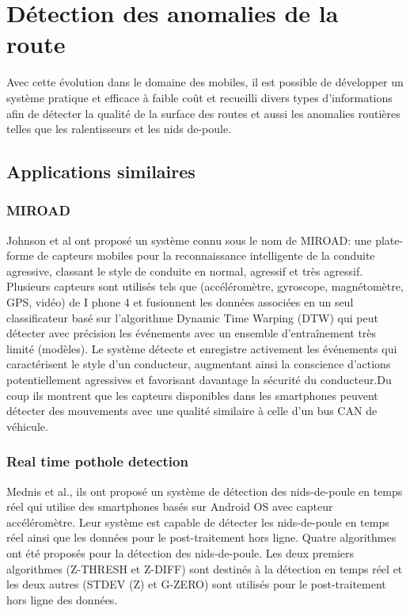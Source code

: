 \renewcommand\labelitemi{-}
\renewcommand\labelitemii{$\circ$}
\renewcommand {\thesection}{\arabic{section}}
\chapter{Détection des anomalies de la route}

Avec cette évolution dans le domaine des mobiles, il est possible de développer un système pratique et efficace à faible coût et
 recueilli divers types d'informations afin de détecter la qualité de la surface des routes et aussi les anomalies routières telles
  que les ralentisseurs et les nids de-poule.

\section{Applications similaires}
  \subsection{MIROAD}
  Johnson et al ont proposé un système connu sous le nom de MIROAD: une plate-forme de capteurs mobiles pour
 la reconnaissance intelligente de la conduite agressive, classant le style de conduite en normal, agressif et très agressif.
Plusieurs capteurs sont utilisés tels que (accéléromètre, gyroscope, magnétomètre, GPS, vidéo) de I phone 
4 et fusionnent les données associées en un seul classificateur basé sur l'algorithme Dynamic Time Warping (DTW) qui peut détecter
 avec précision les événements avec un ensemble d'entraînement très limité (modèles). Le système détecte et enregistre activement les
  événements qui caractérisent le style d’un conducteur, augmentant ainsi la conscience d’actions potentiellement agressives et favorisant
   davantage la sécurité du conducteur.Du coup ils montrent que les capteurs disponibles dans les smartphones peuvent détecter des mouvements
    avec une qualité similaire à celle d'un bus CAN de véhicule.
  \subsection{Real time pothole detection}
  Mednis et al., ils ont proposé un système de détection des nids-de-poule en temps réel qui utilise des smartphones
 basés sur Android OS avec capteur accéléromètre. Leur système est capable de détecter les nids-de-poule en
  temps réel ainsi que les données pour le post-traitement hors ligne. Quatre algorithmes ont été proposés pour la détection 
  des nids-de-poule. Les deux premiers algorithmes (Z-THRESH et Z-DIFF) sont destinés à la détection en temps réel et les deux
   autres (STDEV (Z) et G-ZERO) sont utilisés pour le post-traitement hors ligne des données.
